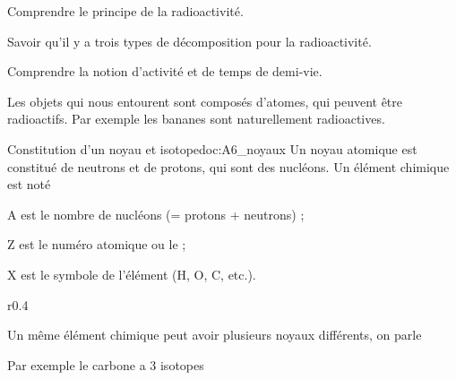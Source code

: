 \teteTermStssImag

\vspace*{-24pt}

\begin{objectifs}
  \item Comprendre le principe de la radioactivité.
  \item Savoir qu'il y a trois types de décomposition pour la radioactivité.
  \item Comprendre la notion d'activité et de temps de demi-vie.
\end{objectifs}

\begin{contexte}
  Les objets qui nous entourent sont composés d'atomes, qui peuvent être radioactifs.
  Par exemple les bananes sont naturellement radioactives.
  
\end{contexte}


\begin{doc}{Constitution d'un noyau et isotope}{doc:A6_noyaux}
  Un noyau atomique est constitué de neutrons et de protons, qui sont des nucléons.
  Un élément chimique est noté 
  \begin{listePoints}
    \item A est le nombre de nucléons (= protons + neutrons) ;
    \item Z est le numéro atomique ou le  ;
    \item X est le symbole de l'élément (H, O, C, etc.).
  \end{listePoints}

  \begin{wrapfigure}{r}{0.4\linewidth}
    \vspace*{-60pt}
    \phantom{b}
  \end{wrapfigure}
  Un même élément chimique peut avoir plusieurs noyaux différents, on parle 
  
  Par exemple le carbone a 3 isotopes
\end{doc}

